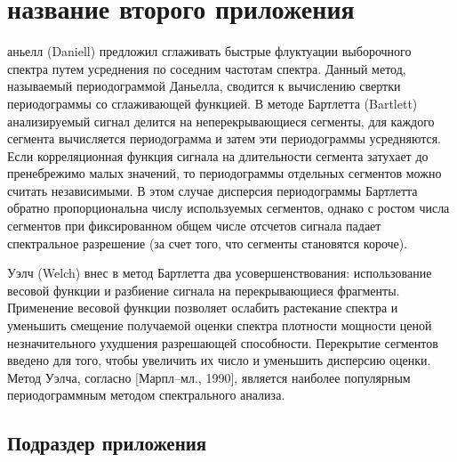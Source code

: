 \chapter{название второго приложения} \label{AppendixB}


аньелл (Daniell) предложил сглаживать быстрые флуктуации выборочного спектра путем усреднения по соседним частотам спектра. Данный метод, называемый периодограммой Даньелла, сводится к вычислению свертки периодограммы со сглаживающей функцией. В методе Бартлетта (Bartlett) анализируемый сигнал делится на неперекрывающиеся сегменты, для каждого сегмента вычисляется периодограмма и затем эти периодограммы усредняются. Если корреляционная функция сигнала на длительности сегмента затухает до пренебрежимо малых значений, то периодограммы отдельных сегментов можно считать независимыми. В этом случае дисперсия периодограммы Бартлетта обратно пропорциональна числу используемых сегментов, однако с ростом числа сегментов при фиксированном общем числе отсчетов сигнала падает спектральное разрешение (за счет того, что сегменты становятся короче).

Уэлч (Welch) внес в метод Бартлетта два усовершенствования: использование весовой функции и разбиение сигнала на перекрывающиеся фрагменты. Применение весовой функции позволяет ослабить растекание спектра и уменьшить смещение получаемой оценки спектра плотности мощности ценой незначительного ухудшения разрешающей способности. Перекрытие сегментов введено для того, чтобы увеличить их число и уменьшить дисперсию оценки. Метод Уэлча, согласно [Марпл--мл., 1990], является наиболее популярным периодограммным методом спектрального анализа.

 \section{Подраздер приложения}\label{AppendixB1}
